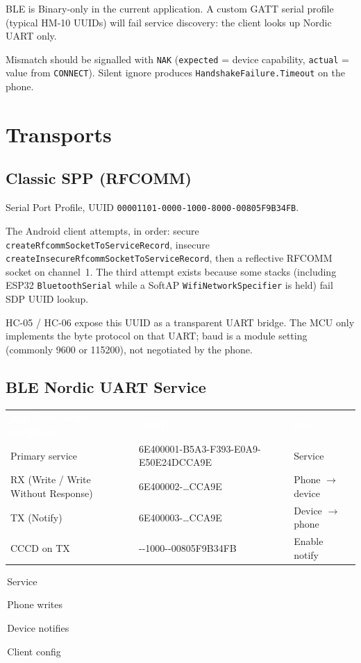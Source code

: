 \documentclass[12pt,a4paper]{article}
\newcommand{\thc}[1]{\textcolor{white}{\bfseries #1}}
\newcommand{\chip}[2]{\colorbox{#1}{\strut\,\scriptsize #2\,}}
\begin{document}
BLE is Binary-only in the current application.
A custom GATT serial profile (typical HM-10 UUIDs) will fail service
discovery: the client looks up Nordic UART only.

Mismatch should be signalled with \texttt{NAK} (\texttt{expected} = device
capability, \texttt{actual} = value from \texttt{CONNECT}).
Silent ignore produces \texttt{HandshakeFailure.Timeout} on the phone.

\section{Transports}
\label{sec:pipes}

\subsection{Classic SPP (RFCOMM)}

Serial Port Profile, UUID
\texttt{00001101-0000-1000-8000-00805F9B34FB}.

The Android client attempts, in order: secure
\texttt{createRfcommSocketToServiceRecord}, insecure
\texttt{createInsecureRfcommSocketToServiceRecord}, then a reflective
RFCOMM socket on channel~1.
The third attempt exists because some stacks (including ESP32
\texttt{BluetoothSerial} while a SoftAP \texttt{WifiNetworkSpecifier} is
held) fail SDP UUID lookup.

HC-05 / HC-06 expose this UUID as a transparent UART bridge.
The MCU only implements the byte protocol on that UART; baud is a module
setting (commonly 9600 or 115200), not negotiated by the phone.

\subsection{BLE Nordic UART Service}

\begin{center}
\renewcommand{\arraystretch}{1.25}
\begin{tabular}{>{\raggedright\arraybackslash}p{4.4cm}
                >{\raggedright\arraybackslash}p{6.2cm}
                >{\centering\arraybackslash}p{2.7cm}}
\rowcolor{TblHead}
\thc{Attribute on the peripheral} & \thc{UUID} & \thc{Role} \\
\rowcolor{TblSync}
Primary service &
  {\small\ttfamily 6E400001-\allowbreak B5A3-F393-\allowbreak E0A9-\allowbreak E50E24DCCA9E} &
  Service \\
\rowcolor{TblChan}
RX (Write / Write Without Response) &
  {\small\ttfamily 6E400002-\ldots CCA9E} &
  Phone $\rightarrow$ device \\
\rowcolor{TblTelem}
TX (Notify) &
  {\small\ttfamily 6E400003-\ldots CCA9E} &
  Device $\rightarrow$ phone \\
\rowcolor{TblLen}
CCCD on TX &
  {\small\ttfamily 00002902-\allowbreak 0000-1000-\allowbreak 8000-\allowbreak 00805F9B34FB} &
  Enable notify \\
\end{tabular}

\vspace{0.4em}
\chip{TblSync}{Service}
\chip{TblChan}{Phone writes}
\chip{TblTelem}{Device notifies}
\chip{TblLen}{Client config}
\end{center}
\end{document}
